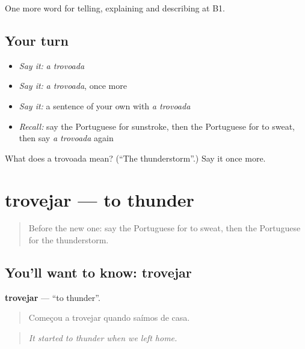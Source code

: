 \begin{grammarlens}[title={What you've built}]
One more word for telling, explaining and describing at B1.
\end{grammarlens}

\subsection*{Your turn}
\begin{itemize}
\raggedright
  \item \emph{Say it:} \emph{a trovoada}
  \item \emph{Say it:} \emph{a trovoada}, once more
  \item \emph{Say it:} a sentence of your own with \emph{a trovoada}
  \item \emph{Recall:} say the Portuguese for sunstroke, then the Portuguese for to sweat, then say \emph{a trovoada} again
\end{itemize}

\begin{tcolorbox}[breakable,colback=teal!4,colframe=teal!35!black,title={Before you move on}]
What does a trovoada mean? (\textquotedblleft{}The thunderstorm\textquotedblright{}.) Say it once more.
\end{tcolorbox}
\section[trovejar]{trovejar — to thunder}

\label{lesson:PT-C463-trovejar}



\begin{quote}
Before the new one: say the Portuguese for to sweat, then the Portuguese for the thunderstorm.
\end{quote}

\subsection*{You'll want to know: trovejar}
\textbf{trovejar} — \textquotedblleft{}to thunder\textquotedblright{}.

\begin{quote}
Começou a trovejar quando saímos de casa.
\end{quote}

\begin{quote}
\emph{It started to thunder when we left home.}
\end{quote}

